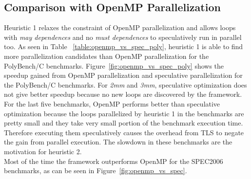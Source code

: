 \documentclass[10pt]{report}          %
\begin{document}
\subsection{Comparison with OpenMP Parallelization}

Heuristic 1 relaxes the constraint of OpenMP parallelization and allows loops with \textit{may dependences} and no \textit{must dependences} to speculatively run in parallel too.  As seen in Table ~\ref{table:openmp_vs_spec_poly}, heuristic 1 is able to find more parallelization candidates than OpenMP parallelization for the PolyBench/C benchmarks.  Figure~\ref{fig:openmp_vs_spec_poly} shows the speedup gained from OpenMP parallelization and speculative parallelization for the PolyBench/C benchmarks.  For \textit{2mm} and \textit{3mm}, speculative optimization does not give better speedup because no new loops are discovered by the framework.  For the last five benchmarks, OpenMP performs better than speculative optimization because the loops parallelized by heuristic 1 in the benchmarks are pretty small and they take very small portion of the benchmark execution time.  Therefore executing them speculatively causes the overhead from TLS to negate the gain from parallel execution.  The slowdown in these benchmarks are the motivation for heuristic 2.\\

Most of the time the framework outperforms OpenMP for the SPEC2006 benchmarks, as can be seen in Figure~\ref{fig:openmp_vs_spec}.
\end{document}
